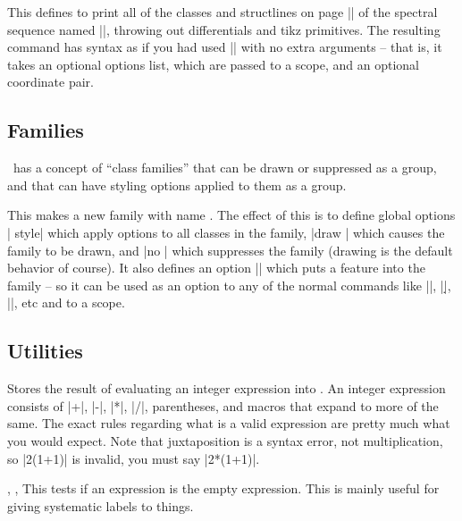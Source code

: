 \begin{sseqdata}[name = basic, cohomological Serre grading]
\begin{command}{\SseqCopyPage{}}
This defines  to print all of the classes and structlines on page || of the spectral sequence named ||, throwing out differentials and tikz primitives. The resulting command has syntax as if you had used |\DeclareSseqGroup| with no extra arguments -- that is, it takes an optional options list, which are passed to a scope, and an optional coordinate pair.
\end{command}

\subsection{Families}
\spectralsequences\ has a concept of ``class families'' that can be drawn or suppressed as a group, and that can have styling options applied to them as a group.
\begin{command}{\SseqNewFamily{}}
This makes a new family with name . The effect of this is to define global options | style| which apply options to all classes in the family, |draw | which causes the family to be drawn, and |no | which suppresses the family (drawing is the default behavior of course). It also defines an option || which puts a feature into the family -- so it can be used as an option to any of the normal commands like |\class|, |\d|, |\structline|, etc and to a scope.

\codeexample[vbox, from file=imJ]
\end{command}


\subsection{Utilities}
\begin{command}{\SseqParseInt{}}
Stores the result of evaluating an integer expression into . An integer expression consists of |+|, |-|, |*|, |/|, parentheses, and macros that expand to more of the same. The exact rules regarding what is a valid expression are pretty much what you would expect. Note that juxtaposition is a syntax error, not multiplication, so |2(1+1)| is invalid, you must say |2*(1+1)|.
\end{command}

\begin{commandlist}{
    \SseqIfEmptyTF{},
    \SseqIfEmptyT{},
    \SseqIfEmptyF{}
}
This tests if an expression is the empty expression. This is mainly useful for giving systematic labels to things.
\end{commandlist}


\end{sseqdata}
